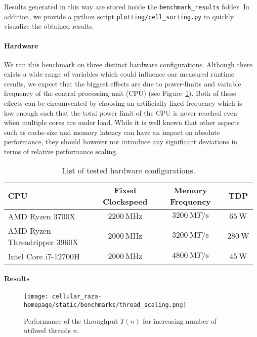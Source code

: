 \documentclass[a4paper]{article}
\begin{document}
Results generated in this way are stored inside the \texttt{benchmark\_results} folder.
In addition, we provide a python script \texttt{plotting/cell\_sorting.py} to quickly visualize
the obtained results.

\paragraph{Hardware}
We ran this benchmark on three distinct hardware configurations.
Although there exists a wide range of variables which could influence our measured runtime results,
we expect that the biggest effects are due to power-limits and variable frequency of the
central processing unit (CPU) (see Figure~\ref{tab:hardware-configurations}).
Both of these effects can be circumvented by choosing an artificially fixed frequency which is low
enough such that the total power limit of the CPU is never reached even when multiple cores are
under load.
While it is well known that other aspects such as cache-size and memory latency can have an impact
on absolute performance, they should however not introduce any significant deviations in terms of
relative performance scaling.

\begin{table}
    \centering
    \begin{tabular}{l c c c}
        CPU & Fixed Clockspeed & Memory Frequency & TDP\\
        \hline
        AMD Ryzen 3700X~\cite{AMDProductSpecifications} & $\SI{2200}{\mega\hertz}$
            & $\SI{3200}{\mega T\per\second}$ & $\SI{65}{\watt}$\\
        AMD Ryzen Threadripper 3960X~\cite{AMDProductSpecifications} & $\SI{2000}{\mega\hertz}$
            & $\SI{3200}{\mega T\per\second}$ & $\SI{280}{\watt}$\\
        Intel Core i7-12700H~\cite{Inteli712700H} & $\SI{2000}{\mega\hertz}$
            & $\SI{4800}{\mega T\per\second}$
            & $\SI{45}{\watt}$\\
    \end{tabular}
    \caption{List of tested hardware configurations.}
    \label{tab:hardware-configurations}
\end{table}

\paragraph{Results}

\begin{figure}[H]
    \centering
    \texttt{[image: cellular\_raza-homepage/static/benchmarks/thread\_scaling.png]}
    \caption[Throughput performance of the cell-sorting example]
    {Performance of the throughput $T(n)$ for increasing number of utilized threads $n$.}
    \label{fig:amdahls-law-fit}
\end{figure}
\end{document}

